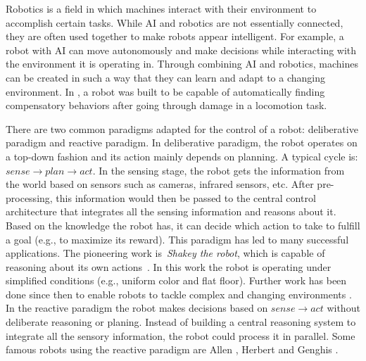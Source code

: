 Robotics is a field in which machines interact with their environment to accomplish certain tasks. While AI and robotics are not essentially connected, they are often used together to make robots appear intelligent. For example, a robot with AI can move autonomously and make decisions while interacting with the environment it is operating in. Through combining AI and robotics, machines can be created in such a way that they can learn and adapt to a changing environment. In \cite{Cully2015}, a robot was built to be capable of automatically finding compensatory behaviors after going through damage in a locomotion task. 

There are two common paradigms adapted for the control of a robot: deliberative paradigm and reactive paradigm. In deliberative paradigm, the robot operates on a top-down fashion and its action mainly depends on planning. A typical cycle is: $sense \rightarrow plan \rightarrow act$. In the sensing stage, the robot gets the information from the world based on sensors such as cameras, infrared sensors, etc. After pre-processing, this information would then be passed to the central control architecture that integrates all the sensing information and reasons about it. Based on the knowledge the robot has, it can decide which action to take to fulfill a goal (e.g., to maximize its reward). This paradigm has led to many successful applications. The pioneering work is~\textit{Shakey the robot}, which is capable of reasoning about its own actions~\cite{Nilsson1984}. In this work the robot is operating under simplified conditions (e.g., uniform color and flat floor). Further work has been done since then to enable robots to tackle complex and changing environments \cite{Dimitrov:ICSMC:2013}. In the reactive paradigm the robot makes decisions based on $sense \rightarrow act$ without deliberate reasoning or planing. Instead of building a central reasoning system to integrate all the sensory information, the robot could process it in parallel. Some famous robots using the reactive paradigm are Allen \cite{Brooks1986}, Herbert \cite{Buchanan:1984} and Genghis \cite{Brooks:1989}. 
 
